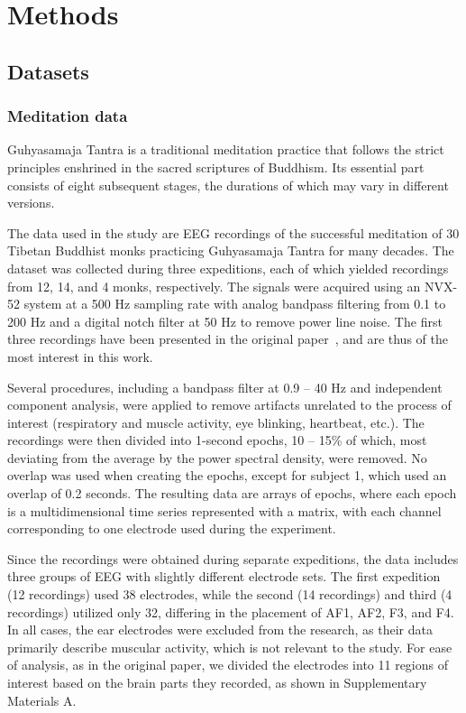 \documentclass[pdflatex,sn-basic,Numbered]{sn-jnl}
\begin{document}
\section{Methods}

\subsection{Datasets}

\subsubsection{Meditation data}

Guhyasamaja Tantra is a traditional meditation practice that follows the strict principles enshrined in the sacred scriptures of Buddhism. Its essential part consists of eight subsequent stages, the durations of which may vary in different versions.

The data used in the study are EEG recordings of the successful meditation of 30 Tibetan Buddhist monks practicing Guhyasamaja Tantra for many decades. The dataset was collected during three expeditions, each of which yielded recordings from 12, 14, and 4 monks, respectively. The signals were acquired using an NVX-52 system at a 500 Hz sampling rate with analog bandpass filtering from 0.1 to 200 Hz and a digital notch filter at 50 Hz to remove power line noise. The first three recordings have been presented in the original paper~\cite{SDA}, and are thus of the most interest in this work. 

Several procedures, including a bandpass filter at 0.9 -- 40 Hz and independent component analysis, were applied to remove artifacts unrelated to the process of interest (respiratory and muscle activity, eye blinking, heartbeat, etc.). The recordings were then divided into 1-second epochs, 10 -- 15\% of which, most deviating from the average by the power spectral density, were removed. No overlap was used when creating the epochs, except for subject 1, which used an overlap of 0.2 seconds. The resulting data are arrays of epochs, where each epoch is a multidimensional time series represented with a matrix, with each channel corresponding to one electrode used during the experiment.

Since the recordings were obtained during separate expeditions, the data includes three groups of EEG with slightly different electrode sets. The first expedition (12 recordings) used 38 electrodes, while the second (14 recordings) and third (4 recordings) utilized only 32, differing in the placement of AF1, AF2, F3, and F4. In all cases, the ear electrodes were excluded from the research, as their data primarily describe muscular activity, which is not relevant to the study. For ease of analysis, as in the original paper, we divided the electrodes into 11 regions of interest based on the brain parts they recorded, as shown in Supplementary Materials A.
\end{document}
